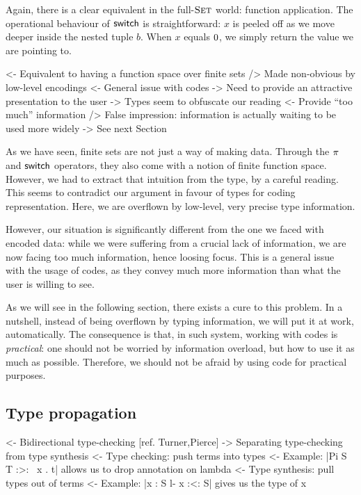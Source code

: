 Again, there is a clear equivalent in the full-$\Set$ world: function
application. The operational behaviour of $\F{switch}$ is
straightforward: $x$ is peeled off as we move deeper inside the nested
tuple $b$. When $x$ equals $\Ze$, we simply return the value we are
pointing to.

\begin{wstructure}
<- Equivalent to having a function space over finite sets
    /> Made non-obvious by low-level encodings
        <- General issue with codes
             -> Need to provide an attractive presentation to the user
    -> Types seem to obfuscate our reading
        <- Provide ``too much'' information
        /> False impression: information is actually waiting to be used more widely
        -> See next Section
\end{wstructure}

As we have seen, finite sets are not just a way of making
data. Through the $\spi{}{}$ and $\F{switch}$ operators, they also
come with a notion of finite function space. However, we had to
extract that intuition from the type, by a careful reading. This seems
to contradict our argument in favour of types for coding
representation. Here, we are overflown by low-level, very precise type
information.

However, our situation is significantly different from the one we
faced with encoded data: while we were suffering from a crucial lack
of information, we are now facing too much information, hence loosing
focus. This is a general issue with the usage of codes, as they convey
much more information than what the user is willing to see. 

As we will see in the following section, there exists a cure to this
problem. In a nutshell, instead of being overflown by typing
information, we will put it at work, automatically. The consequence is
that, in such system, working with codes is \emph{practical}: one
should not be worried by information overload, but how to use it as
much as possible. Therefore, we should not be afraid by using code for
practical purposes.


\subsection{Type propagation}
\label{sec:type-propagation}

\begin{wstructure}
<- Bidirectional type-checking [ref. Turner,Pierce]
    -> Separating type-checking from type synthesis
    <- Type checking: push terms into types
        <- Example: |Pi S T :>: \ x . t| allows us to drop annotation on lambda
    <- Type synthesis: pull types out of terms
        <- Example: |x : S l- x :<: S| gives us the type of x
\end{wstructure}

